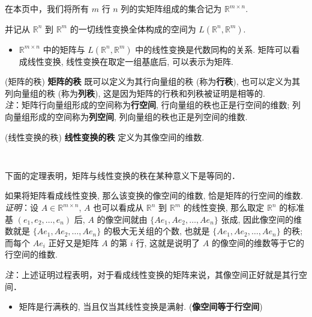 
在本页中，我们将所有 $m$ 行 $n$ 列的实矩阵组成的集合记为 $\mathbb{R}^{m\times n}.$

并记从 $\mathbb{R}^{n}$ 到 $\mathbb{R}^{m}$ 的一切线性变换全体构成的空间为 $L(\mathbb{R}^{n},\mathbb{R}^{m}).$
\begin{itemize}
\item $\mathbb{R}^{m\times n}$ 中的矩阵与 $L(\mathbb{R}^{n},\mathbb{R}^{m})$
中的线性变换是代数同构的关系. 矩阵可以看成线性变换, 线性变换在取定一组基底后, 可以表示为矩阵. 
\end{itemize}

\begin{definition}{(矩阵的秩)}
\textbf{矩阵的秩} 既可以定义为其行向量组的秩 (称为\textbf{行秩}), 也可以定义为其列向量组的秩 (称为\textbf{列秩}),
这是因为矩阵的行秩和列秩被证明是相等的. \\

\textsl{注}：矩阵行向量组形成的空间称为\textbf{行空间}, 行向量组的秩也正是行空间的维数;
列向量组形成的空间称为\textbf{列空间}, 列向量组的秩也正是列空间的维数.
\end{definition}



\begin{definition}{(线性变换的秩)}
\textbf{线性变换的秩} 定义为其像空间的维数.
\end{definition} 
\verb| |

下面的定理表明，矩阵与线性变换的秩在某种意义下是等同的．
\begin{theorem}{}
 如果将矩阵看成线性变换, 那么该变换的像空间的维数, 恰是矩阵的行空间的维数.\\

\textsl{ 证明}：设 $A\in\mathbb{R}^{m\times n}$, $A$ 也可以看成从 $\mathbb{R}^{n}$ 到 $\mathbb{R}^{m}$
的线性变换, 那么取定 $\mathbb{R}^{n}$ 的标准基 $(e_{1},e_{2},\ldots,e_{n})$ 后,
$A$ 的像空间就由 $\{Ae_{1},Ae_{2},\ldots,Ae_{n}\}$ 张成, 因此像空间的维数就是 $\{Ae_{1},Ae_{2},\ldots,Ae_{n}\}$
的极大无关组的个数, 也就是 $\{Ae_{1},Ae_{2},\ldots,Ae_{n}\}$ 的秩; 而每个 $Ae_{i}$
正好又是矩阵 $A$ 的第 $i$ 行, 这就是说明了 $A$ 的像空间的维数等于它的行空间的维数. 
\end{theorem}

\textsl{注}：上述证明过程表明，对于看成线性变换的矩阵来说，其像空间正好就是其行空间． 

\begin{itemize}
\item 矩阵是行满秩的, 当且仅当其线性变换是满射. (\textbf{像空间等于行空间})
\end{itemize}

